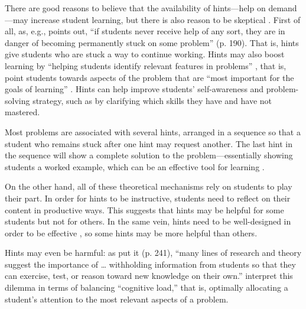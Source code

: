 \documentclass{article}\usepackage[]{graphicx}\usepackage[]{color}
\begin{document}
There are good reasons to believe that the availability of
hints---help on demand---may increase student learning, but there is
also reason to be skeptical \cite[See][for an overview of the theory]{aleven2016help}.
First of all, as, e.g., \citet{anderson1995cognitive} points out, ``if
students never receive help of any sort, they are in danger of becoming
permanently stuck on some problem'' (p. 190).
That is, hints give students who are stuck a way to continue working.
Hints may also boost learning by ``helping students identify relevant features in
problems'' \citep[][p. 6]{aleven2016help},  that is, point students
towards aspects of the problem that are ``most important for the goals
of learning'' \citep[][p. 782]{koedinger2012knowledge}.
Hints can help improve students' self-awareness and
problem-solving strategy, such as by clarifying which skills they have
and have not mastered.

Most problems are associated with several hints, arranged in a
sequence so that a student who remains stuck after one hint may
request another.
The last hint in the sequence will show a complete solution to the
problem---essentially showing students a worked example, which can be an
effective tool for learning \citep[e.g.][]{sweller1985use}.

On the other hand, all of these theoretical mechanisms rely on
students to play their part.
In order for hints to be instructive, students need to reflect on
their content in productive ways.
This suggests that hints may be helpful for some students but not for
others.
In the same vein, hints need to be well-designed in order to be
effective \citep{mckendree1990effective}, so some hints may be more
helpful than others.

Hints may even be harmful: as \citet{koedinger2007exploring} put it
(p. 241),
``many lines of research and theory suggest the importance of \dots
withholding information from students so that they can exercise, test,
or reason toward new knowledge on their own.''
\citet{paas1994variability} interpret this dilemma in terms of balancing
``cognitive load,'' that is, optimally allocating a student's
attention to the most relevant aspects of a problem.
\end{document}
